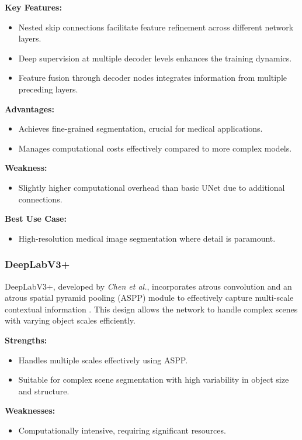 \noindent \textbf{Key Features:}
\begin{itemize}
  \item Nested skip connections facilitate feature refinement across different network layers.
  \item Deep supervision at multiple decoder levels enhances the training dynamics.
  \item Feature fusion through decoder nodes integrates information from multiple preceding layers.
\end{itemize}

\noindent \textbf{Advantages:}
\begin{itemize}
  \item Achieves fine-grained segmentation, crucial for medical applications.
  \item Manages computational costs effectively compared to more complex models.
\end{itemize}

\noindent \textbf{Weakness:}
\begin{itemize}
  \item Slightly higher computational overhead than basic UNet due to additional connections.
\end{itemize}

\noindent \textbf{Best Use Case:}
\begin{itemize}
  \item High-resolution medical image segmentation where detail is paramount.
\end{itemize}

\subsubsection{DeepLabV3+}
DeepLabV3+, developed by \textit{Chen et al.}, incorporates atrous convolution and an atrous spatial pyramid pooling (ASPP) module to effectively capture multi-scale contextual information \cite{chen2018deeplabv3+}. This design allows the network to handle complex scenes with varying object scales efficiently.

\noindent \textbf{Strengths:}
\begin{itemize}
  \item Handles multiple scales effectively using ASPP.
  \item Suitable for complex scene segmentation with high variability in object size and structure.
\end{itemize}

\noindent \textbf{Weaknesses:}
\begin{itemize}
  \item Computationally intensive, requiring significant resources.
\end{itemize}

